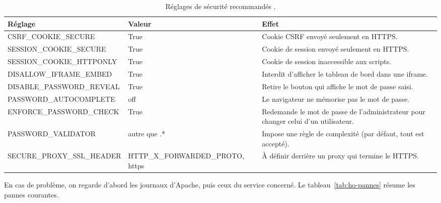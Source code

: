 \begin{table}[H]
\centering
\renewcommand{\arraystretch}{1.3}
\begin{tabular}{@{}>{\raggedright\arraybackslash\ttfamily\small}p{5.0cm}>{\raggedright\arraybackslash\ttfamily\small}p{3.6cm}>{\raggedright\arraybackslash}p{6.9cm}@{}}
\toprule
\textrm{\textbf{Réglage}} & \textrm{\textbf{Valeur}} & \textbf{Effet} \\
\midrule
CSRF\_\allowbreak COOKIE\_\allowbreak SECURE & True & Cookie CSRF envoyé seulement en HTTPS. \\
SESSION\_\allowbreak COOKIE\_\allowbreak SECURE & True & Cookie de session envoyé seulement en HTTPS. \\
SESSION\_\allowbreak COOKIE\_\allowbreak HTTPONLY & True & Cookie de session inaccessible aux scripts. \\
DISALLOW\_\allowbreak IFRAME\_\allowbreak EMBED & True & Interdit d'afficher le tableau de bord dans une iframe. \\
DISABLE\_\allowbreak PASSWORD\_\allowbreak REVEAL & True & Retire le bouton qui affiche le mot de passe saisi. \\
PASSWORD\_\allowbreak AUTOCOMPLETE & off & Le navigateur ne mémorise pas le mot de passe. \\
ENFORCE\_\allowbreak PASSWORD\_\allowbreak CHECK & True & Redemande le mot de passe de l'administrateur pour changer celui d'un utilisateur. \\
PASSWORD\_\allowbreak VALIDATOR & autre que \textrm{.*} & Impose une règle de complexité (par défaut, tout est accepté). \\
SECURE\_\allowbreak PROXY\_\allowbreak SSL\_\allowbreak HEADER & HTTP\_\allowbreak X\_\allowbreak FORWARDED\_\allowbreak PROTO, https & À définir derrière un proxy qui termine le HTTPS. \\
\bottomrule
\end{tabular}
\caption{Réglages de sécurité recommandés \parencite{security-guide-dashboard, horizon-settings}.}
\label{tab:ho-secu}
\end{table}

En cas de problème, on regarde d'abord les journaux d'Apache, puis ceux du service concerné. Le tableau~\ref{tab:ho-pannes}
résume les pannes courantes.

